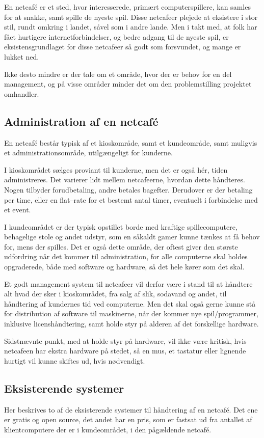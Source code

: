 En netcafé er et sted, hvor interesserede, primært computerspillere, kan samles for at snakke, samt spille de
nyeste spil. Disse netcafeer plejede at eksistere i stor stil, rundt omkring i landet, såvel som i andre
lande. Men i takt med, at folk har fået hurtigere internetforbindelser, og bedre adgang til de nyeste spil, er
eksistensgrundlaget for disse netcafeer så godt som forsvundet, og mange er lukket ned.

Ikke desto mindre er der tale om et område, hvor der er behov for en del management, og på visse områder
minder det om den problemstilling projektet omhandler.


\subsection{Administration af en netcafé}\label{sec:administration-af-en-netcafe}

En netcafé består typisk af et kioskområde, samt et kundeområde, samt muligvis et administrationsområde,
utilgængeligt for kunderne.

I kioskområdet sælges proviant til kunderne, men det er også hér, tiden administreres. Det varierer lidt
mellem netcafeerne, hvordan dette håndteres. Nogen tilbyder forudbetaling, andre betales bagefter. Derudover
er der betaling per time, eller en flat--rate for et bestemt antal timer, eventuelt i forbindelse med et
event.

I kundeområdet er der typisk opstillet borde med kraftige spillecomputere, behagelige stole og andet udstyr,
som en såkaldt gamer kunne tænkes at få behov for, mens der spilles. Det er også dette område, der oftest
giver den største udfordring når det kommer til administration, for alle computerne skal holdes opgraderede,
både med software og hardware, så det hele kører som det skal.

Et godt management system til netcafeer vil derfor være i stand til at håndtere alt hvad der sker i
kioskområdet, fra salg af slik, sodavand og andet, til håndtering af kundernes tid ved computerne. Men det
skal også gerne kunne stå for distribution af software til maskinerne, når der kommer nye spil/programmer,
inklusive licenshåndtering, samt holde styr på alderen af det forskellige hardware.

Sidstnævnte punkt, med at holde styr på hardware, vil ikke være kritisk, hvis netcafeen har ekstra hardware på
stedet, så en mus, et tastatur eller lignende hurtigt vil kunne skiftes ud, hvis nødvendigt.


\subsection{Eksisterende systemer}\label{sec:eksisterende-systemer}

Her beskrives to af de eksisterende systemer til håndtering af en netcafé. Det ene er gratis og open source, det andet har en pris, som er fastsat ud fra antallet af klientcomputere der er i kundeområdet, i den pågældende netcafé.


\cbend